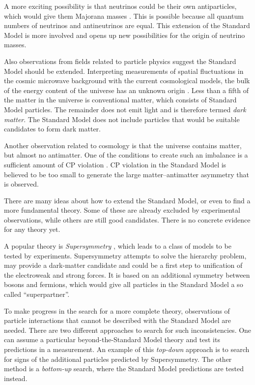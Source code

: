 A more exciting possibility is that neutrinos could be their own antiparticles, which would give them Majorana masses
\cite{Majorana:1937vz}. This is possible because all quantum numbers of neutrinos and antineutrinos are equal. This extension of the
Standard Model is more involved and opens up new possibilities for the origin of neutrino masses.

Also observations from fields related to particle physics suggest the Standard Model should be extended. Interpreting measurements of
spatial fluctuations in the cosmic microwave background with the current cosmological models, the bulk of the energy content of the
universe has an unknown origin \cite{Hinshaw:2012aka}. Less than a fifth of the matter in the universe is conventional matter, which
consists of Standard Model particles. The remainder does not emit light and is therefore termed \emph{dark matter}. The Standard Model does
not include particles that would be suitable candidates to form dark matter.

Another observation related to cosmology is that the universe contains matter, but almost no antimatter. One of the conditions to create
such an imbalance is a sufficient amount of CP violation \cite{Sakharov:1967dj}. CP violation in the Standard Model is believed to be too
small to generate the large matter--antimatter asymmetry that is observed.

There are many ideas about how to extend the Standard Model, or even to find a more fundamental theory. Some of these are already excluded
by experimental observations, while others are still good candidates. There is no concrete evidence for any theory yet.

A popular theory is \emph{Supersymmetry} \cite{Golfand:1971iw,*Volkov:1973ix,*Wess:1974tw}, which leads to a class of models to be tested
by experiments. Supersymmetry attempts to solve the hierarchy problem, may provide a dark-matter candidate and could be a first step to
unification of the electroweak and strong forces. It is based on an additional symmetry between bosons and fermions, which would give all
particles in the Standard Model a so called ``superpartner''.

To make progress in the search for a more complete theory, observations of particle interactions that cannot be described with the Standard
Model are needed. There are two different approaches to search for such inconsistencies. One can assume a particular beyond-the-Standard
Model theory and test its predictions in a measurement. An example of this \emph{top-down} approach is to search for signs of the
additional particles predicted by Supersymmetry. The other method is a \emph{bottom-up} search, where the Standard Model predictions are
tested instead.

